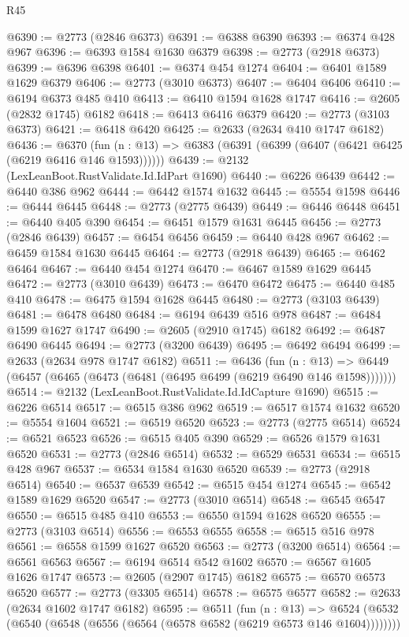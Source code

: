 \begin{lexlean}{R45}
\begin{coremodule}
@6390 := @2773 (@2846 @6373)
@6391 := @6388 @6390
@6393 := @6374 @428 @967
@6396 := @6393 @1584 @1630 @6379
@6398 := @2773 (@2918 @6373)
@6399 := @6396 @6398
@6401 := @6374 @454 @1274
@6404 := @6401 @1589 @1629 @6379
@6406 := @2773 (@3010 @6373)
@6407 := @6404 @6406
@6410 := @6194 @6373 @485 @410
@6413 := @6410 @1594 @1628 @1747
@6416 := @2605 (@2832 @1745) @6182
@6418 := @6413 @6416 @6379
@6420 := @2773 (@3103 @6373)
@6421 := @6418 @6420
@6425 := @2633 (@2634 @410 @1747 @6182)
@6436 := @6370
    (fun (n : @13) => @6383 (@6391 (@6399 (@6407 (@6421 @6425 (@6219 @6416 @146 @1593))))))
@6439 := @2132 (LexLeanBoot.RustValidate.Id.IdPart @1690)
@6440 := @6226 @6439
@6442 := @6440 @386 @962
@6444 := @6442 @1574 @1632
@6445 := @5554 @1598
@6446 := @6444 @6445
@6448 := @2773 (@2775 @6439)
@6449 := @6446 @6448
@6451 := @6440 @405 @390
@6454 := @6451 @1579 @1631 @6445
@6456 := @2773 (@2846 @6439)
@6457 := @6454 @6456
@6459 := @6440 @428 @967
@6462 := @6459 @1584 @1630 @6445
@6464 := @2773 (@2918 @6439)
@6465 := @6462 @6464
@6467 := @6440 @454 @1274
@6470 := @6467 @1589 @1629 @6445
@6472 := @2773 (@3010 @6439)
@6473 := @6470 @6472
@6475 := @6440 @485 @410
@6478 := @6475 @1594 @1628 @6445
@6480 := @2773 (@3103 @6439)
@6481 := @6478 @6480
@6484 := @6194 @6439 @516 @978
@6487 := @6484 @1599 @1627 @1747
@6490 := @2605 (@2910 @1745) @6182
@6492 := @6487 @6490 @6445
@6494 := @2773 (@3200 @6439)
@6495 := @6492 @6494
@6499 := @2633 (@2634 @978 @1747 @6182)
@6511 := @6436
    (fun (n : @13) => @6449 (@6457 (@6465 (@6473 (@6481 (@6495 @6499 (@6219 @6490 @146 @1598)))))))
@6514 := @2132 (LexLeanBoot.RustValidate.Id.IdCapture @1690)
@6515 := @6226 @6514
@6517 := @6515 @386 @962
@6519 := @6517 @1574 @1632
@6520 := @5554 @1604
@6521 := @6519 @6520
@6523 := @2773 (@2775 @6514)
@6524 := @6521 @6523
@6526 := @6515 @405 @390
@6529 := @6526 @1579 @1631 @6520
@6531 := @2773 (@2846 @6514)
@6532 := @6529 @6531
@6534 := @6515 @428 @967
@6537 := @6534 @1584 @1630 @6520
@6539 := @2773 (@2918 @6514)
@6540 := @6537 @6539
@6542 := @6515 @454 @1274
@6545 := @6542 @1589 @1629 @6520
@6547 := @2773 (@3010 @6514)
@6548 := @6545 @6547
@6550 := @6515 @485 @410
@6553 := @6550 @1594 @1628 @6520
@6555 := @2773 (@3103 @6514)
@6556 := @6553 @6555
@6558 := @6515 @516 @978
@6561 := @6558 @1599 @1627 @6520
@6563 := @2773 (@3200 @6514)
@6564 := @6561 @6563
@6567 := @6194 @6514 @542 @1602
@6570 := @6567 @1605 @1626 @1747
@6573 := @2605 (@2907 @1745) @6182
@6575 := @6570 @6573 @6520
@6577 := @2773 (@3305 @6514)
@6578 := @6575 @6577
@6582 := @2633 (@2634 @1602 @1747 @6182)
@6595 := @6511
    (fun (n : @13) =>
    @6524 (@6532 (@6540 (@6548 (@6556 (@6564 (@6578 @6582 (@6219 @6573 @146 @1604))))))))

\end{coremodule}
\end{lexlean}
